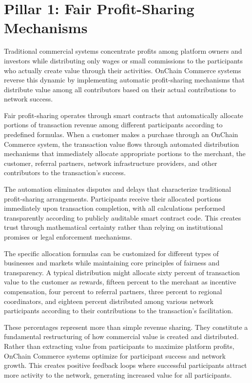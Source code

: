 \documentclass[
  Letterpaper,
]{scrbook}
\begin{document}
\section{Pillar 1: Fair Profit-Sharing
Mechanisms}\label{pillar-1-fair-profit-sharing-mechanisms}

Traditional commercial systems concentrate profits among platform owners
and investors while distributing only wages or small commissions to the
participants who actually create value through their activities. OnChain
Commerce systems reverse this dynamic by implementing automatic
profit-sharing mechanisms that distribute value among all contributors
based on their actual contributions to network success.

Fair profit-sharing operates through smart contracts that automatically
allocate portions of transaction revenue among different participants
according to predefined formulas. When a customer makes a purchase
through an OnChain Commerce system, the transaction value flows through
automated distribution mechanisms that immediately allocate appropriate
portions to the merchant, the customer, referral partners, network
infrastructure providers, and other contributors to the transaction's
success.

The automation eliminates disputes and delays that characterize
traditional profit-sharing arrangements. Participants receive their
allocated portions immediately upon transaction completion, with all
calculations performed transparently according to publicly auditable
smart contract code. This creates trust through mathematical certainty
rather than relying on institutional promises or legal enforcement
mechanisms.

The specific allocation formulas can be customized for different types
of businesses and markets while maintaining core principles of fairness
and transparency. A typical distribution might allocate sixty percent of
transaction value to the customer as rewards, fifteen percent to the
merchant as incentive compensation, four percent to referral partners,
three percent to regional coordinators, and eighteen percent distributed
among various network participants according to their contributions to
the transaction's facilitation.

These percentages represent more than simple revenue sharing. They
constitute a fundamental restructuring of how commercial value is
created and distributed. Rather than extracting value from participants
to maximize platform profits, OnChain Commerce systems optimize for
participant success and network growth. This creates positive feedback
loops where successful participants attract more activity to the
network, generating increased value for all participants.
\end{document}
